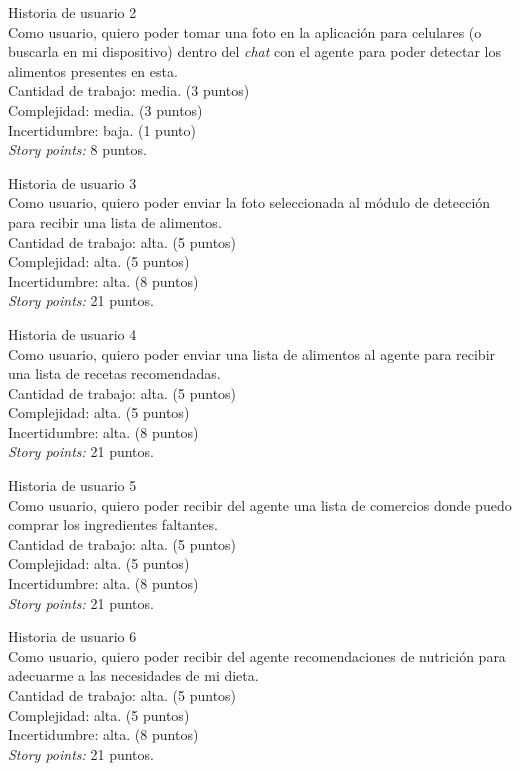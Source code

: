 \documentclass[
11pt, %
]{charter}
\begin{document}
Historia de usuario 2 \\
Como usuario, quiero poder tomar una foto en la aplicación para celulares (o buscarla en mi dispositivo) dentro del \textit{chat} con el agente para poder detectar los alimentos presentes en esta.\\
Cantidad de trabajo: media. (3 puntos)\\
Complejidad: media. (3 puntos)\\
Incertidumbre: baja. (1 punto)\\
\textit{Story points:} 8 puntos.

Historia de usuario 3 \\
Como usuario, quiero poder enviar la foto seleccionada al módulo de detección para recibir una lista de alimentos. \\
Cantidad de trabajo: alta. (5 puntos)\\
Complejidad: alta. (5 puntos)\\
Incertidumbre: alta. (8 puntos)\\
\textit{Story points:} 21 puntos.

Historia de usuario 4 \\
Como usuario, quiero poder enviar una lista de alimentos al agente para recibir una lista de recetas recomendadas. \\
Cantidad de trabajo: alta. (5 puntos)\\
Complejidad: alta. (5 puntos)\\
Incertidumbre: alta. (8 puntos)\\
\textit{Story points:} 21 puntos.

Historia de usuario 5 \\
Como usuario, quiero poder recibir del agente una lista de comercios donde puedo comprar los ingredientes faltantes. \\
Cantidad de trabajo: alta. (5 puntos)\\
Complejidad: alta. (5 puntos)\\
Incertidumbre: alta. (8 puntos)\\
\textit{Story points:} 21 puntos.

Historia de usuario 6 \\
Como usuario, quiero poder recibir del agente recomendaciones de nutrición para adecuarme a las necesidades de mi dieta. \\
Cantidad de trabajo: alta. (5 puntos)\\
Complejidad: alta. (5 puntos)\\
Incertidumbre: alta. (8 puntos)\\
\textit{Story points:} 21 puntos.
\end{document}
